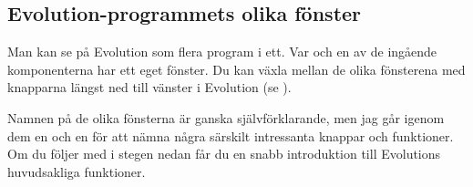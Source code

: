 \documentclass[a4paper,final]{memoir} %
\begin{document}
\subsection{Evolution-programmets olika fönster}


Man kan se på Evolution som flera program i ett. Var och en av de ingående komponenterna har ett eget fönster. Du kan växla mellan de olika fönsterena med knapparna längst ned till vänster i Evolution (se ).


Namnen på de olika fönsterna är ganska självförklarande, men jag går igenom dem en och en för att nämna några särskilt intressanta knappar och funktioner. Om du följer med i stegen nedan får du en snabb introduktion till Evolutions huvudsakliga funktioner.
\end{document}
